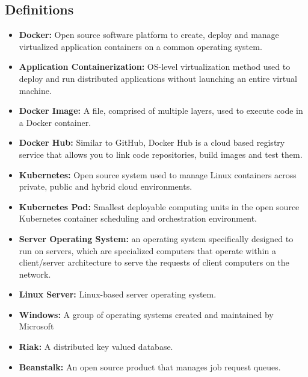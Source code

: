 \documentclass[onecolumn, draftclsnofoot,10pt, compsoc]{IEEEtran}
\begin{document}
\subsection{Definitions}
\begin{itemize}
    \item \textbf{Docker:} Open source software platform to create, deploy and manage virtualized application containers on a common operating system\cite{tech}.
    
\item \textbf{Application Containerization:} OS-level virtualization method used to deploy and run distributed applications without launching an entire virtual machine\cite{tech}.

\item \textbf{Docker Image:} A file, comprised of multiple layers, used to execute code in a Docker container\cite{tech}.

\item \textbf{Docker Hub:} Similar to GitHub, Docker Hub is a cloud based registry service that allows you to link code repositories, build images and test them.
    
\item \textbf{Kubernetes:} Open source system used to manage Linux containers across private, public and hybrid cloud environments\cite{tech}.



\item \textbf{Kubernetes Pod:} Smallest deployable computing units in the open source Kubernetes container scheduling and orchestration environment\cite{tech}.

\item \textbf{Server Operating System:} an operating system specifically designed to run on servers, which are specialized computers that operate within a client/server architecture to serve the requests of client computers on the network\cite{tech}.

\item \textbf{Linux Server:} Linux-based server operating system\cite{tech}.

\item \textbf{Windows:} A group of operating systems created and maintained by Microsoft

\item \textbf{Riak:} A distributed key valued database.

\item \textbf{Beanstalk:} An open source product that manages job request queues.


\end{itemize}
\end{document}
